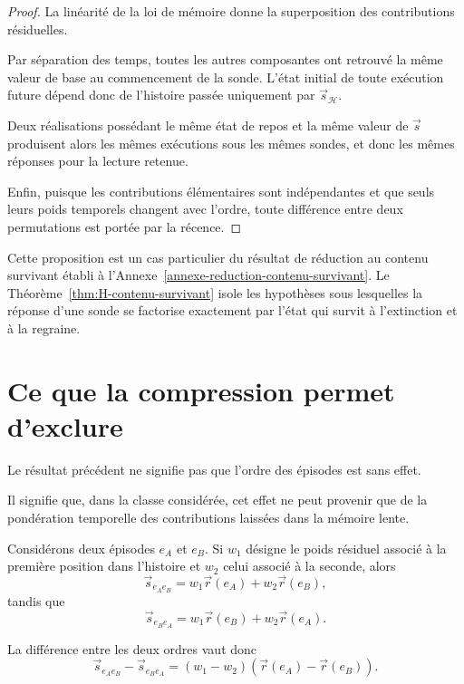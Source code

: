 \begin{proof}
La linéarité de la loi de mémoire donne la superposition des contributions résiduelles.

Par séparation des temps, toutes les autres composantes ont retrouvé la même valeur de base au commencement de la sonde. L'état initial de toute exécution future dépend donc de l'histoire passée uniquement par $\vec s_{\mathcal H}$.

Deux réalisations possédant le même état de repos et la même valeur de $\vec s$ produisent alors les mêmes exécutions sous les mêmes sondes, et donc les mêmes réponses pour la lecture retenue.

Enfin, puisque les contributions élémentaires sont indépendantes et que seuls leurs poids temporels changent avec l'ordre, toute différence entre deux permutations est portée par la récence.
\end{proof}

Cette proposition est un cas particulier du résultat de réduction au contenu survivant établi à l'Annexe~\ref{annexe-reduction-contenu-survivant}. Le Théorème~\ref{thm:H-contenu-survivant} isole les hypothèses sous lesquelles la réponse d'une sonde se factorise exactement par l'état qui survit à l'extinction et à la regraine.

\section{Ce que la compression permet d'exclure}
\label{t3-ce-que-la-compression-exclut}

Le résultat précédent ne signifie pas que l'ordre des épisodes est sans effet.

Il signifie que, dans la classe considérée, cet effet ne peut provenir que de la pondération temporelle des contributions laissées dans la mémoire lente.

Considérons deux épisodes $e_A$ et $e_B$. Si $w_1$ désigne le poids résiduel associé à la première position dans l'histoire et $w_2$ celui associé à la seconde, alors
\[
\vec s_{e_Ae_B}
=
w_1\vec r(e_A)+w_2\vec r(e_B),
\]
tandis que
\[
\vec s_{e_Be_A}
=
w_1\vec r(e_B)+w_2\vec r(e_A).
\]

La différence entre les deux ordres vaut donc
\begin{equation}
\label{eq:t3-difference-recence}
\boxed{
\vec s_{e_Ae_B}-\vec s_{e_Be_A}
=
(w_1-w_2)
\left(
\vec r(e_A)-\vec r(e_B)
\right).
}
\end{equation}

